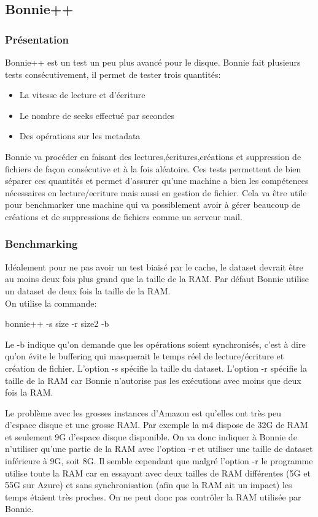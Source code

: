 \documentclass[11pt]{article}
\begin{document}
\pagebreak
\subsection{Bonnie++}
\subsubsection{Présentation}
	Bonnie++ est un test un peu plus avancé pour le disque.
	Bonnie fait plusieurs tests consécutivement, il permet de tester trois
	quantités:
	\begin{itemize}
	\item La vitesse de lecture et d'écriture
	\item Le nombre de seeks effectué par secondes
	\item Des opérations sur les metadata
	\end{itemize}
	Bonnie va procéder en faisant des lectures,écritures,créations et
	suppression de fichiers de façon consécutive et à la fois aléatoire.
	Ces tests permettent de bien séparer ces quantités et permet 
	d'assurer qu'une machine a bien les compétences nécessaires en
	lecture/ecriture mais aussi en gestion de fichier. Cela va être
	utile pour benchmarker une machine qui va possiblement avoir à gérer
	beaucoup de créations et de suppressions de fichiers comme un serveur
	mail.\\

\subsubsection{Benchmarking}
	Idéalement pour ne pas avoir un test biaisé par le cache, le dataset
	devrait être au moins deux fois plus grand que la taille de la RAM. Par
	défaut Bonnie utilise un dataset de deux fois la taille de la RAM. \\

	On utilise la commande:
	\begin{center}
		bonnie++ -s size -r size2 -b
	\end{center}
	Le -b indique qu'on demande que les opérations soient synchronisés,
	c'est à dire qu'on évite le buffering qui masquerait le temps réel de
	lecture/écriture et création de fichier.
	L'option -s spécifie la taille du dataset.  L'option -r spécifie la
	taille de la RAM car Bonnie n'autorise pas les exécutions avec moins que
	deux fois la RAM.

	Le problème avec les grosses instances d'Amazon est qu'elles ont très
	peu d'espace disque et une grosse RAM. Par exemple la m4 dispose de 32G
	de RAM et seulement 9G d'espace disque disponible. On va donc indiquer
	à Bonnie de n'utiliser qu'une partie de la RAM avec l'option -r et
	utiliser une taille de dataset inférieure à 9G, soit 8G. Il semble
	cependant que malgré l'option -r le programme utilise toute la RAM car
	en essayant avec deux tailles de RAM différentes (5G et 55G sur Azure)
	et sans synchronisation (afin que la RAM ait un impact) les temps
	étaient très proches. On ne peut donc pas contrôler la RAM utilisée par
	Bonnie.
\end{document}
